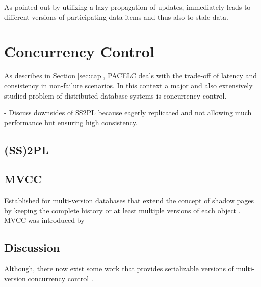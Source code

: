 As pointed out by \cite{cho:2000} utilizing a lazy propagation of updates, immediately leads to different versions of participating data items and thus also to stale data.  





\section{Concurrency Control}
As describes in Section \ref{sec:cap}, PACELC deals with the trade-off of latency and consistency in non-failure scenarios.
In this context a major and also extensively studied problem  of distributed database systems is concurrency control.

- Discuss downsides of SS2PL because eagerly  replicated and not allowing much performance but ensuring high consistency.

\subsection{(SS)2PL}
\subsection{MVCC}
Established for multi-version databases that extend the concept of shadow pages by keeping the complete history or at least multiple versions of each object \cite{bernstein:1982}.
MVCC was introduced by \cite{bernstein:1983}

\subsection{Discussion}
Although, there now exist some work that provides serializable versions of multi-version concurrency control \cite{faleiro:2015}.



